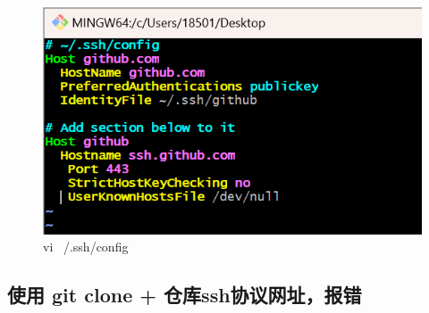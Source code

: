 \documentclass{ctexart}
\begin{document}
\begin{enumerate}
    \begin{figure}[H]
        \centering
        \includegraphics[width=18cm]{2.png}
        \caption{vi ~/.ssh/config}
        \label{fig:24}
    \end{figure}
\end{enumerate}

\subsection{使用 git clone + 仓库ssh协议网址，报错}
\end{document}
